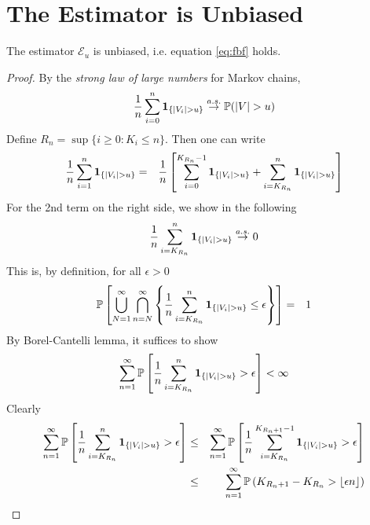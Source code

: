 \documentclass[aoas,preprint]{imsart}
\numberwithin{equation}{section}
\theoremstyle{plain}
\begin{document}
\section{The Estimator is Unbiased}\label{sec:consistency}
\begin{theorem}
  The estimator $\mathcal E_u$ is unbiased, i.e. equation
  \eqref{eq:fbf} holds.
\end{theorem}
\begin{proof}
  By the {\em strong law of large numbers} for Markov chains,
  \begin{eqnarray*}
    {1 \over n} \sum_{i=0}^n \mathbf{1}_{\{|V_i| > u\}} \overset{a.s.}{\to} \mathbb{P}(|V| > u)
  \end{eqnarray*}
  Define $R_n =\sup\{i \geq 0: K_i \leq n\}$. Then one can write
  \begin{eqnarray}
    {1 \over n} \sum_{i=1}^n \mathbf{1}_{\{|V_i| > u\}}
    &=& 
    {1 \over n} \left[
      \sum_{i=0}^{K_{R_n}-1} \mathbf{1}_{\{|V_i| > u\}} + \sum_{i=K_{R_n}}^n \mathbf{1}_{\{|V_i| > u\}}
    \right]
    \label{eq:kioj}
  \end{eqnarray}
  For the 2nd term on the right side, we show in the following
  \begin{equation}
    \label{eq:frf}
    {1 \over n}\sum_{i=K_{R_n}}^n \mathbf{1}_{\{|V_i| > u\}} \overset{a.s.}{\to} 0
  \end{equation}
  This is, by definition, for all $\epsilon > 0$
  \begin{eqnarray*}
    \mathbb{P} \left[
      \bigcup_{N=1}^\infty \bigcap_{n=N}^\infty
      \left\{
        {1 \over n} \sum_{i=K_{R_n}}^{n} \mathbf{1}_{\{|V_i| > u\}} \leq \epsilon
      \right\}
    \right] &=& 1
  \end{eqnarray*}
  By Borel-Cantelli lemma, it suffices to show
  \[
  \sum_{n=1}^\infty \mathbb{P}\left[
    {1 \over n} \sum_{i=K_{R_n}}^{n} \mathbf{1}_{\{|V_i| > u\}} > \epsilon
  \right] < \infty
  \]
  Clearly
  \begin{eqnarray*}
    \sum_{n=1}^\infty \mathbb{P}\left[
      {1 \over n} \sum_{i=K_{R_n}}^{n} \mathbf{1}_{\{|V_i| > u\}} > \epsilon
    \right]
    &\leq&
    \sum_{n=1}^\infty \mathbb{P}\left[
      {1 \over n} \sum_{i=K_{R_n}}^{K_{R_n + 1} - 1} \mathbf{1}_{\{|V_i| > u\}} > \epsilon
    \right] \\
    &\leq&
    \sum_{n=1}^\infty \mathbb{P}\left(
      {K_{R_n + 1} - K_{R_n}} > \lfloor \epsilon n\rfloor
    \right)
  \end{eqnarray*}

\end{proof}
\end{document}
